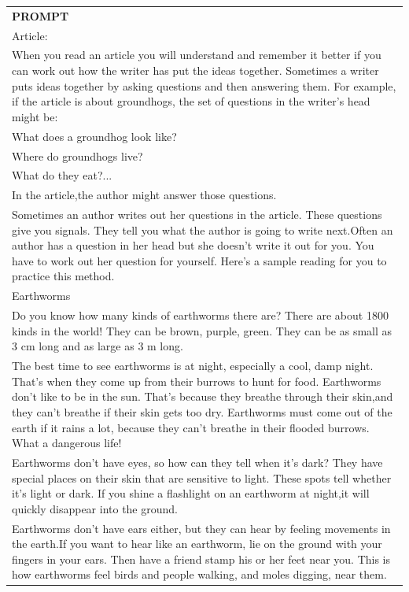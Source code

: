 \begin{table}[h]
    \centering \small
\begin{tabular}{p{14cm}}
\toprule
\textbf{PROMPT}\\
Article:\\
When you read an article you will understand and remember it better if you can work out how the writer has put the ideas together. Sometimes a writer puts ideas together by asking questions and then answering them. For example, if the article is about groundhogs, the set of questions in the writer's head might be:\\
What does a groundhog look like?\\
Where do groundhogs live?\\
What do they eat?...\\
In the article,the author might answer those questions.\\
Sometimes an author writes out her questions in the article. These questions give you signals. They tell you what the author is going to write next.Often an author has a question in her head but she doesn't write it out for you. You have to work out her question for yourself. Here's a sample reading for you to practice this method.\\
Earthworms\\
Do you know how many kinds of earthworms there are? There are about 1800 kinds in the world! They can be brown, purple, green. They can be as small as 3 cm long and as large as 3 m long.\\
The best time to see earthworms is at night, especially a cool, damp night. That's when they come up from their burrows to hunt for food. Earthworms don't like to be in the sun. That's because they breathe through their skin,and they can't breathe if their skin gets too dry. Earthworms must come out of the earth if it rains a lot, because they can't breathe in their flooded burrows. What a dangerous life!\\
Earthworms don't have eyes, so how can they tell when it's dark? They have special places on their skin that are sensitive to light. These spots tell whether it's light or dark. If you shine a flashlight on an earthworm at night,it will quickly disappear into the ground.\\
Earthworms don't have ears either, but they can hear by feeling movements in the earth.If you want to hear like an earthworm, lie on the ground with your fingers in your ears. Then have a friend stamp his or her feet near you. This is how earthworms feel birds and people walking, and moles digging, near them.\\

\end{tabular}
\end{table}
